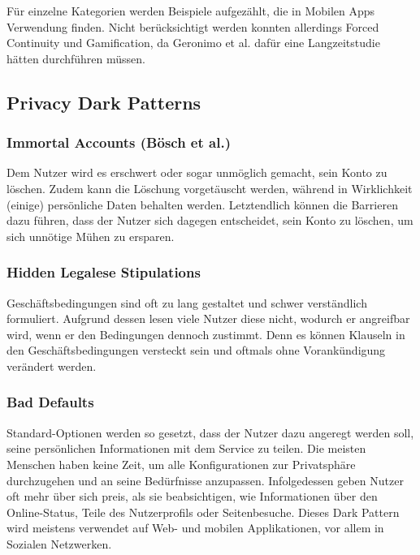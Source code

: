 \documentclass[a4paper]{article}
\newcommand{\todo}[1]{{\color{purple}{#1}}}
\begin{document}
Für einzelne Kategorien werden Beispiele aufgezählt, die in Mobilen Apps Verwendung finden. Nicht berücksichtigt werden konnten allerdings Forced Continuity und Gamification, da Geronimo et al. dafür eine Langzeitstudie hätten durchführen müssen.\newline

\todo{Tabelle mit UI-Beispielen hinzufügen}

\subsection{Privacy Dark Patterns}
\label{sub:privacy_dark_patterns}
\todo{Privacy Dark Patterns beschreiben}


\subsubsection{Immortal Accounts (Bösch et al.)}
Dem Nutzer wird es erschwert oder sogar unmöglich gemacht, sein Konto zu löschen. Zudem kann die Löschung vorgetäuscht werden, während in Wirklichkeit (einige) persönliche Daten behalten werden. Letztendlich können die Barrieren dazu führen, dass der Nutzer sich dagegen entscheidet, sein Konto zu löschen, um sich unnötige Mühen zu ersparen. 

\subsubsection{Hidden Legalese Stipulations}
Geschäftsbedingungen sind oft zu lang gestaltet und schwer verständlich formuliert. Aufgrund dessen lesen viele Nutzer diese nicht, wodurch er angreifbar wird, wenn er den Bedingungen dennoch zustimmt. Denn es können Klauseln in den Geschäftsbedingungen versteckt sein und oftmals ohne Vorankündigung verändert werden.  

\subsubsection{Bad Defaults}
Standard-Optionen werden so gesetzt, dass der Nutzer dazu angeregt werden soll, seine persönlichen Informationen mit dem Service zu teilen. Die meisten Menschen haben keine Zeit, um alle Konfigurationen zur Privatsphäre durchzugehen und an seine Bedürfnisse anzupassen. Infolgedessen geben Nutzer oft mehr über sich preis, als sie beabsichtigen, wie Informationen über den Online-Status, Teile des Nutzerprofils oder Seitenbesuche. Dieses Dark Pattern wird meistens verwendet auf Web- und mobilen Applikationen, vor allem in Sozialen Netzwerken.  
\end{document}
